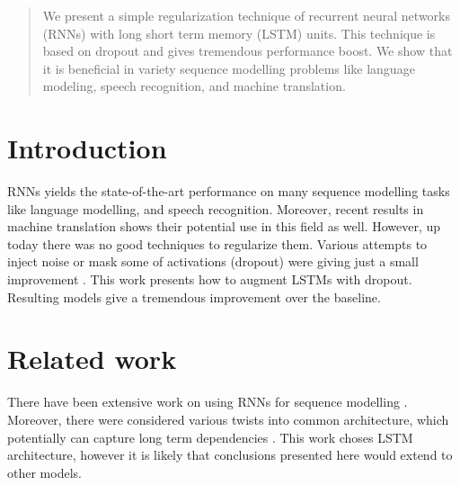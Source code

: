 \documentclass{article}
\begin{document}
 


\begin{abstract} 
  We present a simple regularization technique of recurrent neural networks (RNNs)
  with long short term memory (LSTM) units.
  This technique is based on dropout and gives tremendous performance boost.
  We show that it is beneficial in variety sequence modelling problems like
  language modeling, speech recognition, and machine translation.

\end{abstract} 

\section{Introduction}
RNNs yields the state-of-the-art performance on many sequence modelling
tasks like language modelling, and speech recognition. Moreover, recent results in 
machine translation \cite{cho2014learning} shows their potential use in this field as well. 
However, up today there was no good techniques to regularize them. 
Various attempts to inject noise or mask some of activations (dropout) were 
giving just a small improvement \cite{graves2013generating}. This work presents
how to augment LSTMs with dropout. Resulting models give a tremendous 
improvement over the baseline.




\section{Related work}
There have been extensive work on using RNNs for sequence modelling
\cite{mikolov2012statistical, sutskever2013training}. Moreover, there were
considered various twists into common architecture, which 
potentially can capture long term dependencies \cite{hochreiter1997long, graves2009novel, cho2014learning}. This work choses LSTM architecture, however it is likely that conclusions 
presented here would extend to other models. 
\end{document}
